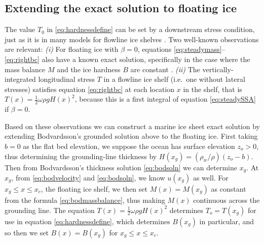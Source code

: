 \documentclass[review,letterpaper]{igs}
\begin{document}
\subsection*{Extending the exact solution to floating ice}  The value $T_0$ in \eqref{eq:hardnessdefine} can be set by a downstream stress condition, just as it is in many models for flowline ice shelves \citep[e.g.][]{MISMIP2012,SchoofMarine1}.  Two well-known observations are relevant:  \emph{(i)}  For floating ice with $\beta=0$, equations \eqref{eq:steadymass}--\eqref{eq:rightbc} also have a known exact solution, specifically in the case where the mass balance $M$ and the ice hardness $B$ are constant \citep{vanderVeen83,vanderVeen}.  \emph{(ii)}  The vertically-integrated longitudinal stress $T$ in a flowline ice shelf (i.e.~one without lateral stresses) satisfies equation \eqref{eq:rightbc} at each location $x$ in the shelf, that is $T(x) = \frac{1}{2} \omega \rho g H(x)^2$, because this is a first integral of equation \eqref{eq:steadySSA} if $\beta=0$.

Based on these observations we can construct a marine ice sheet exact solution by extending Bodvardsson's grounded solution above to the floating ice.  First taking $b=0$ as the flat bed elevation, we suppose the ocean has surface elevation $z_o>0$, thus determining the grounding-line thickness by $H(x_g) = (\rho_w/\rho) (z_o - b)$.  Then from Bodvardsson's thickness solution \eqref{eq:bodsoln} we can determine $x_g$.  At $x_g$, from \eqref{eq:bodvelocity} and \eqref{eq:bodsoln}, we know $u(x_g)$ as well.  For $x_g \le x \le x_c$, the floating ice shelf, we then set $M(x) = M(x_g)$ as constant from the formula \eqref{eq:bodmassbalance}, thus making $M(x)$ continuous across the grounding line.  The equation $T(x) = \frac{1}{2} \omega \rho g H(x)^2$ determines $T_o=T(x_g)$ for use in equation \eqref{eq:hardnessdefine}, which determines $B(x_g)$ in particular, and so then we set $B(x)=B(x_g)$ for $x_g \le x \le x_c$.
\end{document}
